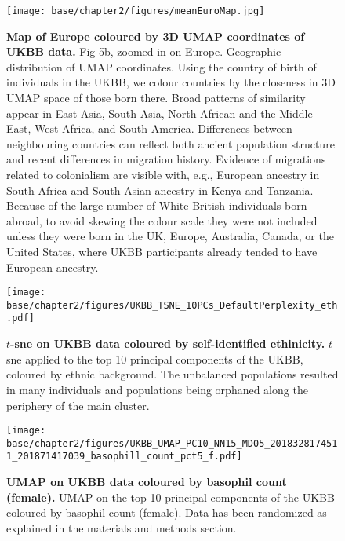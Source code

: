 \newpage

\begin{figure}[ht]
    \centering
    \texttt{[image: base/chapter2/figures/meanEuroMap.jpg]}
    \caption[Map of Europe coloured by 3D UMAP coordinates of UKBB data]{\textbf{Map of Europe coloured by 3D UMAP coordinates of UKBB data.} Fig 5b, zoomed in on Europe. Geographic distribution of UMAP coordinates. Using the country of birth of individuals in the UKBB, we colour countries by the closeness in 3D UMAP space of those born there. Broad patterns of similarity appear in East Asia, South Asia, North African and the Middle East, West Africa, and South America. Differences between neighbouring countries can reflect both ancient population structure and recent differences in migration history. Evidence of migrations related to colonialism are visible with, e.g., European ancestry in South Africa and South Asian ancestry in Kenya and Tanzania. Because of the large number of White British individuals born abroad, to avoid skewing the colour scale they were not included unless they were born in the UK, Europe, Australia, Canada, or the United States, where UKBB participants already tended to have European ancestry.}
    \label{fig:supp_umap_ukbb_eur}
\end{figure}

\newpage

\begin{figure}[!htb]
    \centering
    \texttt{[image: base/chapter2/figures/UKBB\_TSNE\_10PCs\_DefaultPerplexity\_eth.pdf]}
    \caption[$t$-sne on UKBB data coloured by self-identified ethinicity]{\textbf{$t$-sne on UKBB data coloured by self-identified ethinicity.} $t$-sne applied to the top 10 principal components of the UKBB, coloured by ethnic background. The unbalanced populations resulted in many individuals and populations being orphaned along the periphery of the main cluster.}
    \label{fig:supp_ukbb_tsne}
\end{figure}

\begin{figure}[ht]
    \centering
    \texttt{[image: base/chapter2/figures/UKBB\_UMAP\_PC10\_NN15\_MD05\_2018328174511\_201871417039\_basophill\_count\_pct5\_f.pdf]}
    \caption[UMAP on UKBB data coloured by basophil count (female)]{\textbf{UMAP on UKBB data coloured by basophil count (female).} UMAP on the top 10 principal components of the UKBB coloured by basophil count (female). Data has been randomized as explained in the materials and methods section.}
    \label{fig:supp_ukbb_basophill_f}
\end{figure}

